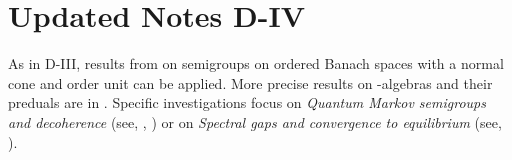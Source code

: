 \section{Updated Notes D-IV}
As in D-III, results from  on semigroups on ordered Banach spaces with a normal cone and order unit can be applied. 
More precise results on \WA-algebras and their preduals are in .
Specific investigations focus on \emph{Quantum Markov semigroups and decoherence} (see, \eg, ) or on \emph{Spectral gaps and convergence to equilibrium} (see, \eg {}).